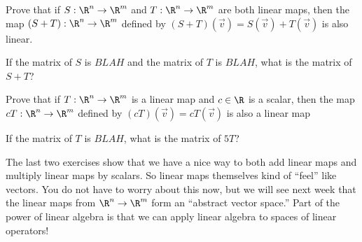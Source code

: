 \documentclass{article}
\begin{document}
\begin{question}
  Prove that if $S:\R^n \to\R^m$ and $T:\R^n \to \R^m$ are both linear maps, 
  then the map $(S+T):\R^n \to\R^m$ defined by $(S+T)(\vec{v}) = S(\vec{v})+T(\vec{v})$ is also linear.
\end{question}

\begin{question}
  If the matrix of $S$ is $BLAH$ and the matrix of $T$ is $BLAH$, what is the matrix of $S+T$?
\end{question}

\begin{question}
  Prove that if $T:\R^n \to \R^m$ is a linear map and $c \in \R$ is a scalar, then the map $cT:\R^n \to \R^m$  defined by $(cT)(\vec{v}) = cT(\vec{v})$ is also 
  a linear map
\end{question}

\begin{question}
  If the matrix of $T$ is $BLAH$, what is the matrix of $5T$?
\end{question}

\begin{observation}
The last two exercises show that we have a nice way to both add linear
maps and multiply linear maps by scalars.  So linear maps themselves
kind of ``feel'' like vectors.  You do not have to worry about this
now, but we will see next week that the linear maps from $\R^n \to
\R^m$ form an ``abstract vector space.''  Part of the power of linear
algebra is that we can apply linear algebra to spaces of linear
operators!
\end{observation}
	
\end{document}
